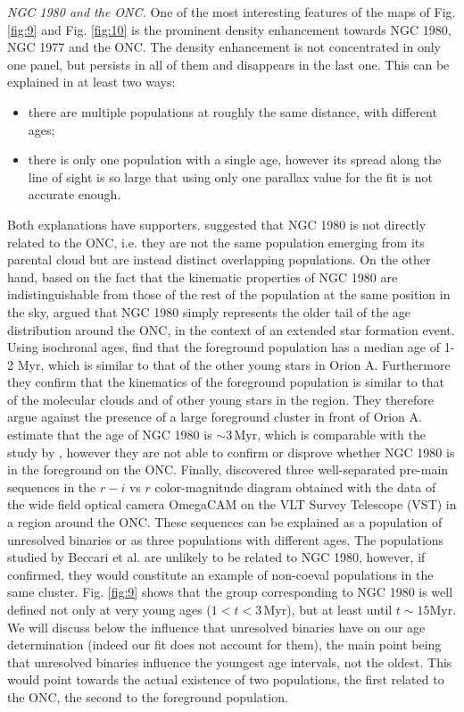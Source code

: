 \documentclass[onecolumn]{aa} %
\begin{document}
\textit{NGC 1980 and the ONC.} One of the most interesting features of the maps of Fig. \ref{fig:9} and Fig. \ref{fig:10} is the prominent density enhancement towards NGC 1980, NGC 1977 and the ONC. The density enhancement is not concentrated in only one panel, but persists in all of them and disappears in the last one. This can be explained in at least two ways:
\begin{itemize} 
\item there are multiple populations at roughly the same distance, with different ages; 
\item there is only one population with a single age, however its spread along the line of sight is so large that using only one parallax value for the fit is not accurate enough.
\end{itemize}
Both explanations have supporters. 
\cite{Alves2012} suggested that NGC 1980 is not directly related to the ONC, i.e. they are not the same population emerging from its parental cloud but are instead distinct overlapping populations. On the other hand, based on the fact that the kinematic properties of NGC 1980 are indistinguishable from those of the rest of the population at the same position in the sky, \cite{DaRio2016} argued that NGC 1980 simply represents the older tail of the age distribution around the ONC, in the context of an extended star formation event. Using isochronal ages, \citet{Fang2017} find that the foreground population has a median age of 1-2 Myr, which is similar to that of the other young stars in Orion A. Furthermore they confirm that the kinematics of the foreground population is similar to that of the molecular clouds and of other young stars in the region. They therefore argue against the presence of a large foreground cluster in front of Orion A. \cite{Kounkel2017b} estimate that the age of NGC 1980 is $\sim 3 \, \mathrm{Myr}$, which is comparable with the study by \citet{Fang2017}, however they are not able to confirm or disprove whether NGC 1980 is in the foreground on the ONC. 
Finally, \citet{Beccari2017} discovered three well-separated pre-main sequences in the $r-i$ vs $r$ color-magnitude diagram obtained with the data of the wide field optical camera OmegaCAM on the VLT Survey Telescope (VST) in a region around the ONC. These sequences can be explained as a population of unresolved binaries or as three populations with different ages. The populations studied by Beccari et al. are unlikely to be related to NGC 1980, however, if confirmed, they would constitute an example of non-coeval populations in the same cluster.
Fig. \ref{fig:9} shows that the group corresponding to NGC 1980 is well defined not only at very young ages ($1 < t < 3 \, \mathrm{Myr}$), but at least until $t \sim 15 \mathrm{Myr}$. We will discuss below the influence that unresolved binaries have on our age determination (indeed our fit does not account for them), the main point being that unresolved binaries influence the youngest age intervals, not the oldest. This would point towards the actual existence of two populations, the first related to the ONC, the second to the \cite{Alves2012} foreground population. 
\end{document}
